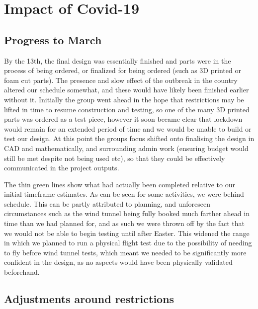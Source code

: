 \documentclass[../../main.tex]{subfiles}
\begin{document}
\section{Impact of Covid-19} \label{sec:project-review:impact-of-covid-19}

\subsection{Progress to March} \label{sec:project-review:impact-of-covid-19:progress-to-march}

By the 13th, the final design was essentially finished and parts were in the process of being ordered, or finalized for being ordered (such as 3D printed or foam cut parts).
The presence and slow effect of the outbreak in the country altered our schedule somewhat, and these would have likely been finished earlier without it.
Initially the group went ahead in the hope that restrictions may be lifted in time to resume construction and testing, so one of the many 3D printed parts was ordered as a test piece, however it soon became clear that lockdown would remain for an extended period of time and we would be unable to build or test our design.
At this point the groups focus shifted onto finalising the design in CAD and mathematically, and surrounding admin work (ensuring budget would still be met despite not being used etc), so that they could be effectively communicated in the project outputs. 

The thin green lines show what had actually been completed relative to our initial timeframe estimates.
As can be seen for some activities, we were behind schedule.
This can be partly attributed to planning, and unforeseen circumstances such as the wind tunnel being fully booked much farther ahead in time than we had planned for, and as such we were thrown off by the fact that we would not be able to begin testing until after Easter.
This widened the range in which we planned to run a physical flight test due to the possibility of needing to fly before wind tunnel tests, which meant we needed to be significantly more confident in the design, as no aspects would have been physically validated beforehand. 

\subsection{Adjustments around restrictions} \label{sec:project-review:impact-of-covid-19:adjustments-around-restrictions}
\end{document}
